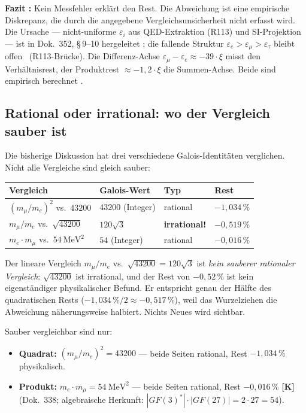 \textbf{Fazit \BM:} Kein Messfehler erklärt den Rest. Die Abweichung ist eine empirische Diskrepanz, die durch die angegebene Vergleichsunsicherheit nicht erfasst wird. Die Ursache --- nicht-uniforme $\varepsilon_i$ aus QED-Extraktion (R113) und SI-Projektion --- ist in Dok.~352, §\,9--10 hergeleitet \KM; die fallende Struktur $\varepsilon_e > \varepsilon_\mu > \varepsilon_\tau$ bleibt offen \SM\ (R113-Brücke).
Die Differenz-Achse $\varepsilon_\mu-\varepsilon_e\approx-39\cdot\xi$
misst den Verhältnisrest, der Produktrest $\approx-1{,}2\cdot\xi$
die Summen-Achse. Beide sind empirisch berechnet \KM.

\subsection*{Rational oder irrational: wo der Vergleich sauber ist}

Die bisherige Diskussion hat drei verschiedene Galois-Identitäten verglichen.
Nicht alle Vergleiche sind gleich sauber:

\begin{center}
\begin{tabular}{@{}llll@{}}
\toprule
Vergleich & Galois-Wert & Typ & Rest \\
\midrule
$(m_\mu/m_e)^2$ vs.\ $43200$ & $43200$ (Integer) & rational & $-1{,}034\,\%$ \\
$m_\mu/m_e$ vs.\ $\sqrt{43200}$ & $120\sqrt{3}$ & \textbf{irrational!} & $-0{,}519\,\%$ \\
$m_e\cdot m_\mu$ vs.\ $54~\text{MeV}^2$ & $54$ (Integer) & rational & $-0{,}016\,\%$ \\
\bottomrule
\end{tabular}
\end{center}

Der lineare Vergleich $m_\mu/m_e$ vs.\ $\sqrt{43200}=120\sqrt{3}$ ist \emph{kein sauberer
rationaler Vergleich}: $\sqrt{43200}$ ist irrational, und der Rest von $-0{,}52\,\%$
ist kein eigenständiger physikalischer Befund. Er entspricht genau der Hälfte des
quadratischen Rests ($-1{,}034\,\%/2\approx-0{,}517\,\%$), weil das Wurzelziehen
die Abweichung näherungsweise halbiert. Nichts Neues wird sichtbar.

Sauber vergleichbar sind nur:
\begin{itemize}\itemsep2pt
\item \textbf{Quadrat:} $(m_\mu/m_e)^2 = 43200$ --- beide Seiten rational,
  Rest $-1{,}034\,\%$ physikalisch.
\item \textbf{Produkt:} $m_e\cdot m_\mu = 54~\text{MeV}^2$ --- beide Seiten rational,
  Rest $-0{,}016\,\%$ \textbf{[K]}{} (Dok.~338; algebraische Herkunft:
  $|GF(3)^*|\cdot|GF(27)| = 2\cdot27 = 54$).
\end{itemize}

